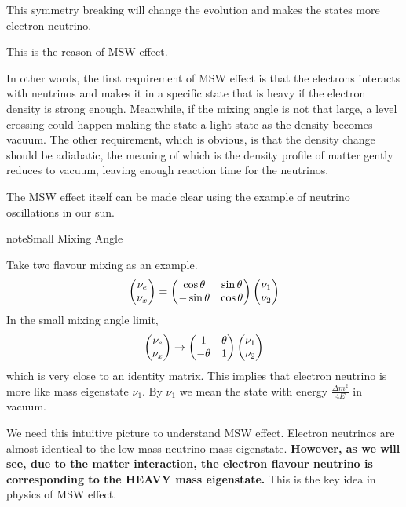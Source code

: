 \documentclass[letterpaper,12pt,english]{sphinxmanual}
\begin{document}
This symmetry breaking will change the evolution and makes the states more electron neutrino.

This is the reason of MSW effect.

In other words, the first requirement of MSW effect is that the electrons interacts with neutrinos and makes it in a specific state that is heavy if the electron density is strong enough. Meanwhile, if the mixing angle is not that large, a level crossing could happen making the state a light state as the density becomes vacuum. The other requirement, which is obvious, is that the density change should be adiabatic, the meaning of which is the density profile of matter gently reduces to vacuum, leaving enough reaction time for the neutrinos.

The MSW effect itself can be made clear using the example of neutrino oscillations in our sun.

\begin{notice}{note}{Small Mixing Angle}

Take two flavour mixing as an example.
\begin{gather}
\begin{split}\begin{pmatrix}\nu_e \\ \nu_x\end{pmatrix} = \begin{pmatrix}  \cos\theta & \sin\theta \\ -\sin\theta  & \cos\theta \end{pmatrix}   \begin{pmatrix}\nu_1 \\ \nu_2\end{pmatrix}\end{split}\notag
\end{gather}
In the small mixing angle limit,
\begin{gather}
\begin{split}\begin{pmatrix}\nu_e \\ \nu_x\end{pmatrix} \to \begin{pmatrix}  1 & \theta \\ -\theta  & 1 \end{pmatrix}   \begin{pmatrix}\nu_1 \\ \nu_2\end{pmatrix}\end{split}\notag
\end{gather}
which is very close to an identity matrix. This implies that electron neutrino is more like mass eigenstate \(\nu_1\). By \(\nu_1\) we mean the state with energy \(\frac{ \Delta m^2 }{4E}\) in vacuum.

We need this intuitive picture to understand MSW effect. Electron neutrinos are almost identical to the low mass neutrino mass eigenstate. \textbf{However, as we will see, due to the matter interaction, the electron flavour neutrino is corresponding to the HEAVY mass eigenstate.} This is the key idea in physics of MSW effect.
\end{notice}
\end{document}

